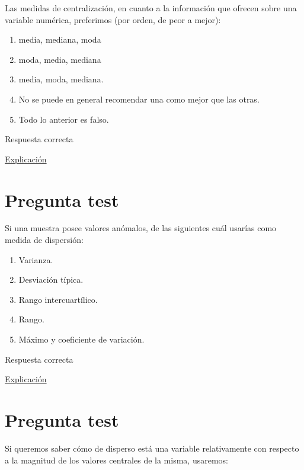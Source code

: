\documentclass[
]{book}
\providecommand{\tightlist}{%
  \setlength{\itemsep}{0pt}\setlength{\parskip}{0pt}}
\begin{document}
Las medidas de centralización, en cuanto a la información que ofrecen sobre una variable numérica, preferimos (por orden, de peor a mejor):

\begin{enumerate}
\def\labelenumi{\alph{enumi})}
\tightlist
\item
  media, mediana, moda
\item
  moda, media, mediana
\item
  media, moda, mediana.
\item
  No se puede en general recomendar una como mejor que las otras.
\item
  Todo lo anterior es falso.
\end{enumerate}

Respuesta correcta

\href{https://1fjmanzano.github.io/bioestadistica/medidas-de-posicio\%CC\%81n-dispersio\%CC\%81n-y-forma.html\#medidas-de-posicio\%CC\%81n-centrales}{Explicación}

\hypertarget{pregunta-test-77}{%
\section{Pregunta test}\label{pregunta-test-77}}

Si una muestra posee valores anómalos, de las siguientes cuál usarías como medida de dispersión:

\begin{enumerate}
\def\labelenumi{\alph{enumi})}
\tightlist
\item
  Varianza.
\item
  Desviación típica.
\item
  Rango intercuartílico.
\item
  Rango.
\item
  Máximo y coeficiente de variación.
\end{enumerate}

Respuesta correcta

\href{https://1fjmanzano.github.io/bioestadistica/medidas-de-posicio\%CC\%81n-dispersio\%CC\%81n-y-forma.html\#medidas-de-dispersio\%CC\%81n}{Explicación}

\hypertarget{pregunta-test-78}{%
\section{Pregunta test}\label{pregunta-test-78}}

Si queremos saber cómo de disperso está una variable relativamente con respecto a la magnitud de los valores centrales de la misma, usaremos:
\end{document}
